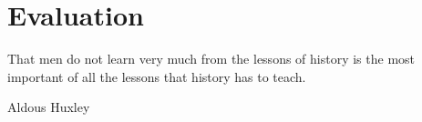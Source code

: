 
\section{Evaluation}
\label{ch:evaluation}

\epigraph{That men do not learn very much from the lessons of history is the most important of all the lessons that history has to teach.}{Aldous Huxley}

\cleardoublepage